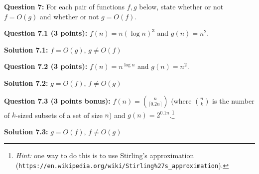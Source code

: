 \documentclass[11pt]{article}
\newcommand{\binom}[2]{{#1 \choose #2}}
\begin{document}
\textbf{Question 7:} For each pair of functions \(f,g\) below, state
whether or not \(f=O(g)\) and whether or not \(g=O(f)\).

\textbf{Question 7.1 (3 points):} \(f(n)=n(\log n)^3\) and \(g(n)=n^2\).

\textbf{Solution 7.1:} $f = O(g)$, $g \neq O(f)$

\textbf{Question 7.2 (3 points):} \(f(n)= n^{\log n}\) and
\(g(n) = n^2\).

\textbf{Solution 7.2:} $g = O(f)$, $f \neq O(g)$

\textbf{Question 7.3 (3 points bonus):}
\(f(n) = \binom{n}{\lceil 0.2 n \rceil}\) (where \(\binom{n}{k}\) is the
number of \(k\)-sized subsets of a set of size \(n\)) and
\(g(n) = 2^{0.1 n}\).\footnote{\emph{Hint:} one way to do this is to use
  {Stirling's approximation} ({\tt https://en.wikipedia.org/wiki/Stirling\%27s\_approximation}).}

\textbf{Solution 7.3:} $g = O(f)$, $f \neq O(g)$
\end{document}
